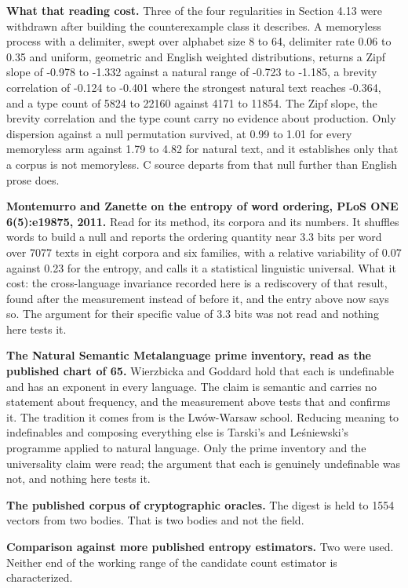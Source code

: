 \textbf{What that reading cost.} Three of the four regularities in Section 4.13 were withdrawn after building the counterexample class it describes. A memoryless process with a delimiter, swept over alphabet size 8 to 64, delimiter rate 0.06 to 0.35 and uniform, geometric and English weighted distributions, returns a Zipf slope of -0.978 to -1.332 against a natural range of -0.723 to -1.185, a brevity correlation of -0.124 to -0.401 where the strongest natural text reaches -0.364, and a type count of 5824 to 22160 against 4171 to 11854. The Zipf slope, the brevity correlation and the type count carry no evidence about production. Only dispersion against a null permutation survived, at 0.99 to 1.01 for every memoryless arm against 1.79 to 4.82 for natural text, and it establishes only that a corpus is not memoryless. C source departs from that null further than English prose does.

\textbf{Montemurro and Zanette on the entropy of word ordering, PLoS ONE 6(5):e19875, 2011.} Read for its method, its corpora and its numbers. It shuffles words to build a null and reports the ordering quantity near 3.3 bits per word over 7077 texts in eight corpora and six families, with a relative variability of 0.07 against 0.23 for the entropy, and calls it a statistical linguistic universal. What it cost: the cross-language invariance recorded here is a rediscovery of that result, found after the measurement instead of before it, and the entry above now says so. The argument for their specific value of 3.3 bits was not read and nothing here tests it.

\textbf{The Natural Semantic Metalanguage prime inventory, read as the published chart of 65.} Wierzbicka and Goddard hold that each is undefinable and has an exponent in every language. The claim is semantic and carries no statement about frequency, and the measurement above tests that and confirms it. The tradition it comes from is the Lwów-Warsaw school. Reducing meaning to indefinables and composing everything else is Tarski's and Leśniewski's programme applied to natural language. Only the prime inventory and the universality claim were read; the argument that each is genuinely undefinable was not, and nothing here tests it.

\textbf{The published corpus of cryptographic oracles.} The digest is held to 1554 vectors from two bodies. That is two bodies and not the field.

\textbf{Comparison against more published entropy estimators.} Two were used. Neither end of the working range of the candidate count estimator is characterized.

